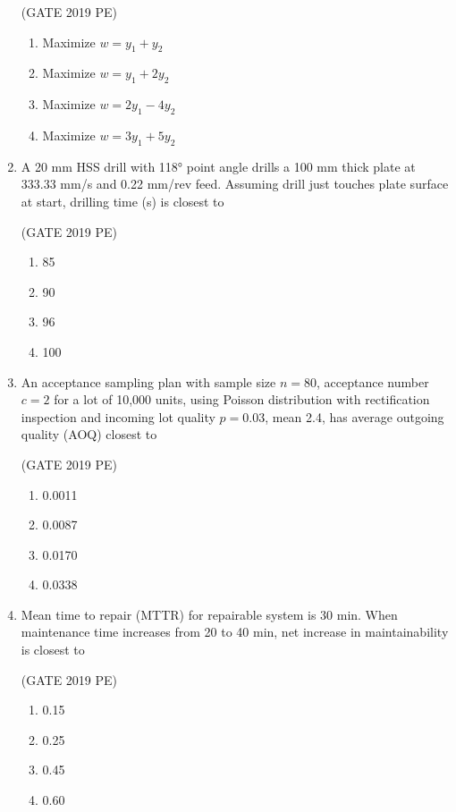 \documentclass[journal,12pt,onecolumn]{exam}
\theoremstyle{remark}
\begin{document}
\begin{enumerate}
\hfill{(GATE 2019 PE)}\\
\begin{enumerate}
    \item Maximize \(w = y_1 + y_2\)
    \item Maximize \(w = y_1 + 2 y_2\)
    \item Maximize \(w = 2y_1 - 4 y_2\)
    \item Maximize \(w = 3 y_1 + 5 y_2\)
\end{enumerate}

\item A 20 mm HSS drill with 118° point angle drills a 100 mm thick plate at 333.33 mm/s and 0.22 mm/rev feed. Assuming drill just touches plate surface at start, drilling time (s) is closest to

\hfill{(GATE 2019 PE)}\\
\begin{enumerate}
    \item 85
    \item 90
    \item 96
    \item 100
\end{enumerate}

\item An acceptance sampling plan with sample size \(n=80\), acceptance number \(c=2\) for a lot of 10,000 units, using Poisson distribution with rectification inspection and incoming lot quality \(p=0.03\), mean 2.4, has average outgoing quality (AOQ) closest to

\hfill{(GATE 2019 PE)}\\
\begin{enumerate}
    \item0.0011
    \item 0.0087
    \item 0.0170
    \item 0.0338
\end{enumerate}

\item Mean time to repair (MTTR) for repairable system is 30 min. When maintenance time increases from 20 to 40 min, net increase in maintainability is closest to

\hfill{(GATE 2019 PE)}\\
\begin{enumerate}
    \item 0.15
    \item 0.25
    \item0.45 
    \item 0.60
\end{enumerate}


\end{enumerate}
\end{document}
